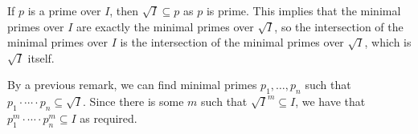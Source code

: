 If $p$ is a prime over $I$, then $\sqrt{I} \subseteq p$ as $p$ is prime.
This implies that the minimal primes over $I$ are exactly the minimal primes
over $\sqrt{I}$, so the intersection of the minimal primes over $I$ is the
intersection of the minimal primes over $\sqrt{I}$, which is $\sqrt{I}$ itself.

By a previous remark, we can find minimal primes $p_1, \ldots, p_n$ such that
$p_1\cdot\cdots\cdot p_n \subseteq \sqrt{I}$. Since there is some $m$ such that
$\sqrt{I}^m \subseteq I$, we have that $p_1^m\cdot\cdots\cdot p_n^m \subseteq I$ as
required.
